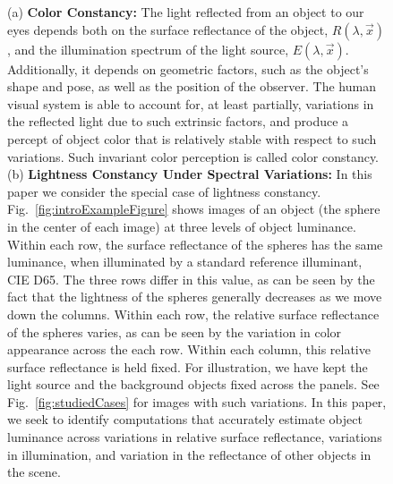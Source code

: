 \documentclass{jov}
\begin{document}
\begin{figure}
    \caption{(a) {\bf Color Constancy:} The light reflected from an object to our eyes depends both on the surface reflectance of the object, $R(\lambda,\vec{x})$, and the illumination spectrum of the light source, $E(\lambda,\vec{x})$. Additionally, it depends on geometric factors, such as the object's shape and pose, as well as the position of the observer. The human visual system is able to account for, at least partially, variations in the reflected light due to such extrinsic factors, and produce a percept of object color that is relatively stable with respect to such variations. Such invariant color perception is called color constancy. (b) {\bf Lightness Constancy Under Spectral Variations:} In this paper we consider the special case of lightness constancy. Fig.~\ref{fig:introExampleFigure} shows images of an object (the sphere in the center of each image) at three levels of object luminance. Within each row, the surface reflectance of the spheres has the same luminance, when illuminated by a standard reference illuminant, CIE D65. The three rows differ in this value, as can be seen by the fact that the lightness of the spheres generally decreases as we move down the columns. Within each row, the relative surface reflectance of the spheres varies, as can be seen by the variation in color appearance across the each row.  Within each column, this relative surface reflectance is held fixed. For illustration, we have kept the light source and the background objects fixed across the panels. See Fig.~\ref{fig:studiedCases} for images with such variations. In this paper, we seek to identify computations that accurately estimate object luminance across variations in relative surface reflectance, variations in illumination, and variation in the reflectance of other objects in the scene.}
 \end{figure}
\end{document}
